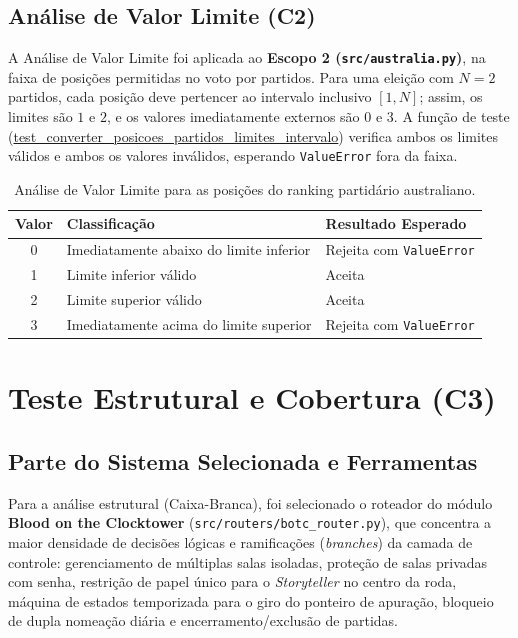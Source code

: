 \documentclass[12pt,a4paper]{article}
\begin{document}
\subsection{Análise de Valor Limite (C2)}
A Análise de Valor Limite foi aplicada ao \textbf{Escopo 2 (\texttt{src/australia.py})}, na faixa de posições permitidas no voto por partidos. Para uma eleição com $N=2$ partidos, cada posição deve pertencer ao intervalo inclusivo $[1,N]$; assim, os limites são $1$ e $2$, e os valores imediatamente externos são $0$ e $3$. A função de teste (\url{test\_converter\_posicoes\_partidos\_limites\_intervalo}) verifica ambos os limites válidos e ambos os valores inválidos, esperando \texttt{ValueError} fora da faixa.

\small
\begin{xltabular}{\textwidth}{|c|Y|Y|}

\caption{Análise de Valor Limite para as posições do ranking partidário australiano.}
\label{tab:avl} \\

\hline
{}
\textbf{Valor} & \textbf{Classificação} &
\textbf{Resultado Esperado} \\ \hline

0 & Imediatamente abaixo do limite inferior & Rejeita com \texttt{ValueError} \\  & Limite inferior válido & Aceita \\  & Limite superior válido & Aceita \\  & Imediatamente acima do limite superior & Rejeita com \texttt{ValueError} \\ \hline
\end{xltabular}
\normalsize

\section{Teste Estrutural e Cobertura (C3)}

\subsection{Parte do Sistema Selecionada e Ferramentas}
Para a análise estrutural (Caixa-Branca), foi selecionado o roteador do módulo \textbf{Blood on the Clocktower} (\texttt{src/routers/botc\_router.py}), que concentra a maior densidade de decisões lógicas e ramificações (\textit{branches}) da camada de controle: gerenciamento de múltiplas salas isoladas, proteção de salas privadas com senha, restrição de papel único para o \textit{Storyteller} no centro da roda, máquina de estados temporizada para o giro do ponteiro de apuração, bloqueio de dupla nomeação diária e encerramento/exclusão de partidas.
\end{document}
